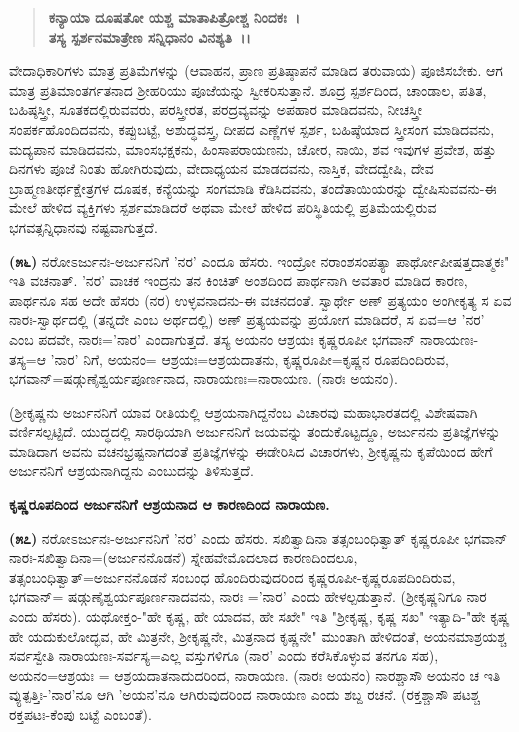 \begin{verse}
\textbf{ಕನ್ಯಾಯಾ ದೂಷತೋ ಯಶ್ಚ ಮಾತಾಪಿತ್ರೋಶ್ಚ ನಿಂದಕಃ~।}\\\textbf{ತಸ್ಯ ಸ್ಪರ್ಶನಮಾತ್ರೇಣ ಸನ್ನಿಧಾನಂ ವಿನಶ್ಯತಿ~।।}
\end{verse}


ವೇದಾಧಿಕಾರಿಗಳು ಮಾತ್ರ ಪ್ರತಿಮೆಗಳನ್ನು (ಆವಾಹನ, ಪ್ರಾಣ ಪ್ರತಿಷ್ಠಾಪನೆ ಮಾಡಿದ ತರುವಾಯ) ಪೂಜಿಸಬೇಕು. ಆಗ ಮಾತ್ರ ಪ್ರತಿಮಾಂತರ್ಗತನಾದ ಶ‍್ರೀಹರಿಯು ಪೂಜೆಯನ್ನು ಸ್ವೀಕರಿಸುತ್ತಾನೆ. ಶೂದ್ರ ಸ್ಪರ್ಶದಿಂದ, ಚಾಂಡಾಲ, ಪತಿತ, ಬಹಿಷ್ಠಸ್ತ್ರೀ, ಸೂತಕದಲ್ಲಿರುವವರು, ಪರಸ್ತ್ರೀರತ, ಪರದ್ರವ್ಯವನ್ನು ಅಪಹಾರ ಮಾಡಿದವನು, ನೀಚಸ್ತ್ರೀ ಸಂಪರ್ಕಹೊಂದಿದವನು, ಕಪ್ಪುಬಟ್ಟೆ, ಅಶುದ್ಧವಸ್ತ್ರ, ದೀಪದ ಎಣ್ಣೆಗಳ ಸ್ಪರ್ಶ, ಬಹಿಷ್ಠೆಯಾದ ಸ್ತ್ರೀಸಂಗ ಮಾಡಿದವನು, ಮದ್ಯಪಾನ ಮಾಡಿದವನು, ಮಾಂಸಭಕ್ಷಕನು, ಹಿಂಸಾಪರಾಯಣನು, ಚೋರ, ನಾಯಿ, ಶವ ಇವುಗಳ ಪ್ರವೇಶ, ಹತ್ತು ದಿನಗಳು ಪೂಜೆ ನಿಂತು ಹೋಗಿರುವುದು, ವೇದಾಧ್ಯಯನ ಮಾಡದವನು, ನಾಸ್ತಿಕ, ವೇದದ್ವೇಷಿ, ದೇವ ಬ್ರಾಹ್ಮಣತೀರ್ಥಕ್ಷೇತ್ರಗಳ ದೂಷಕ, ಕನ್ಯೆಯನ್ನು ಸಂಗಮಾಡಿ ಕೆಡಿಸಿದವನು, ತಂದೆತಾಯಿಯರನ್ನು ದ್ವೇಷಿಸು\-ವವನು-ಈ ಮೇಲೆ ಹೇಳಿದ ವ್ಯಕ್ತಿಗಳು ಸ್ಪರ್ಶಮಾಡಿದರೆ ಅಥವಾ ಮೇಲೆ ಹೇಳಿದ ಪರಿಸ್ಥಿತಿಯಲ್ಲಿ ಪ್ರತಿಮೆಯಲ್ಲಿರುವ ಭಗವತ್ಸನ್ನಿಧಾನವು ನಷ್ಟವಾಗುತ್ತದೆ.

\textbf{(೫೬)} ನರೋಽರ್ಜುನಃ-ಅರ್ಜುನನಿಗೆ 'ನರ' ಎಂದೂ ಹೆಸರು. ಇಂದ್ರೋ ನರಾಂಶ\-ಸಂಪತ್ಯಾ ಪಾರ್ಥೋಪೀಷತ್ತದಾತ್ಮಕಃ" ಇತಿ ವಚನಾತ್. 'ನರ' ವಾಚಕ ಇಂದ್ರನು ತನ ಕಿಂಚಿತ್ ಅಂಶದಿಂದ ಪಾರ್ಥನಾಗಿ ಅವತಾರ ಮಾಡಿದ ಕಾರಣ, ಪಾರ್ಥನೂ ಸಹ ಅದೇ ಹೆಸರು (ನರ) ಉಳ್ಳವನಾದನು-ಈ ವಚನದಂತೆ. ಸ್ವಾರ್ಥೇ ಅಣ್ ಪ್ರತ್ಯಯಂ ಅಂಗೀಕೃತ್ಯ ಸ ಏವ ನಾರಃ-ಸ್ವಾರ್ಥದಲ್ಲಿ (ತನ್ನದೇ ಎಂಬ ಅರ್ಥದಲ್ಲಿ) ಅಣ್ ಪ್ರತ್ಯಯವನ್ನು ಪ್ರಯೋಗ ಮಾಡಿದರೆ, ಸ ಏವ=ಆ 'ನರ' ಎಂಬ ಪದವೇ, ನಾರಃ='ನಾರ' ಎಂದಾಗುತ್ತದೆ. ತಸ್ಯ ಅಯನಂ ಆಶ್ರಯಃ ಕೃಷ್ಣರೂಪೀ ಭಗವಾನ್ ನಾರಾಯಣಃ-ತಸ್ಯ=ಆ 'ನಾರ' ನಿಗೆ, ಅಯನಂ= ಆಶ್ರಯಃ=ಆಶ್ರಯದಾತನು, ಕೃಷ್ಣರೂಪೀ=ಕೃಷ್ಣನ ರೂಪದಿಂದಿರುವ, ಭಗವಾನ್=ಷಡ್ಗುಣೈ\-ಶ್ವರ್ಯಪೂರ್ಣನಾದ, ನಾರಾಯಣಃ=ನಾರಾಯಣ. (ನಾರಃ ಅಯನಂ).

(ಶ‍್ರೀಕೃಷ್ಣನು ಅರ್ಜುನನಿಗೆ ಯಾವ ರೀತಿಯಲ್ಲಿ ಆಶ್ರಯನಾಗಿದ್ದನೆಂಬ ವಿಚಾರವು ಮಹಾಭಾರತದಲ್ಲಿ ವಿಶೇಷವಾಗಿ ವರ್ಣಿಸಲ್ಪಟ್ಟಿದೆ. ಯುದ್ಧದಲ್ಲಿ ಸಾರಥಿಯಾಗಿ ಅರ್ಜುನನಿಗೆ ಜಯವನ್ನು ತಂದುಕೊಟ್ಟದ್ದೂ, ಅರ್ಜುನನು ಪ್ರತಿಜ್ಞೆಗಳನ್ನು ಮಾಡಿದಾಗ ಅವನು ವಚನಭ್ರಷ್ಟನಾಗದಂತೆ ಪ್ರತಿಜ್ಞೆಗಳನ್ನು ಈಡೇರಿಸಿದ ವಿಚಾರಗಳು, ಶ‍್ರೀಕೃಷ್ಣನು ಕೃಪೆಯಿಂದ ಹೇಗೆ ಅರ್ಜುನನಿಗೆ ಆಶ್ರಯನಾಗಿದ್ದನು ಎಂಬುದನ್ನು ತಿಳಿಸುತ್ತದೆ.

\begin{center}
\textbf{ಕೃಷ್ಣರೂಪದಿಂದ ಅರ್ಜುನನಿಗೆ ಆಶ್ರಯನಾದ ಆ ಕಾರಣದಿಂದ ನಾರಾಯಣ.}
\end{center}

\textbf{(೫೭)} ನರೋಽರ್ಜುನಃ-ಅರ್ಜುನನಿಗೆ 'ನರ' ಎಂದು ಹೆಸರು. ಸಖಿತ್ವಾದಿನಾ ತತ್ಸಂಬಂಧಿ\-ತ್ವಾತ್ ಕೃಷ್ಣರೂಪೀ ಭಗವಾನ್ ನಾರಃ-ಸಖಿತ್ವಾದಿನಾ=(ಅರ್ಜುನನೊಡನೆ) ಸ್ನೇಹವೇ\break ಮೊದಲಾದ ಕಾರಣದಿಂದಲೂ, ತತ್ಸಂಬಂಧಿತ್ವಾತ್=ಅರ್ಜುನನೊಡನೆ ಸಂಬಂಧ ಹೊಂದಿರುವುದರಿಂದ ಕೃಷ್ಣರೂಪೀ-ಕೃಷ್ಣರೂಪದಿಂದಿರುವ, ಭಗವಾನ್= ಷಡ್ಗುಣೈಶ್ವರ್ಯಪೂರ್ಣನಾದವನು, ನಾರಃ ='ನಾರ' ಎಂದು ಹೇಳಲ್ಪಡುತ್ತಾನೆ. (ಶ‍್ರೀಕೃಷ್ಣನಿಗೂ ನಾರ ಎಂದು ಹೆಸರು). ಯಥೋಕ್ತಂ-"ಹೇ ಕೃಷ್ಣ, ಹೇ ಯಾದವ, ಹೇ ಸಖೇ" ಇತಿ "ಶ‍್ರೀಕೃಷ್ಣ, ಕೃಷ್ಣ ಸಖ" ಇತ್ಯಾದಿ-"ಹೇ ಕೃಷ್ಣ ಹೇ ಯದುಕುಲೋದ್ಭವ, ಹೇ ಮಿತ್ರನೇ, ಶ‍್ರೀಕೃಷ್ಣನೇ, ಮಿತ್ರನಾದ ಕೃಷ್ಣನೇ" ಮುಂತಾಗಿ ಹೇಳಿದಂತೆ, ಅಯನಮಾಶ್ರಯಶ್ಚ ಸರ್ವಸ್ವೇತಿ ನಾರಾಯಣಃ-\-ಸರ್ವಸ್ಯ=ಎಲ್ಲ ವಸ್ತುಗಳಿಗೂ (ನಾರ' ಎಂದು ಕರೆಸಿಕೊಳ್ಳುವ ತನಗೂ ಸಹ), ಅಯನಂ=\break ಆಶ್ರಯಃ = ಆಶ್ರಯದಾತನಾದುದರಿಂದ, ನಾರಾಯಣ. (ನಾರಃ ಅಯನಂ) ನಾರಶ್ಚಾಸೌ ಅಯನಂ ಚ ಇತಿ ವ್ಯುತ್ಪತ್ತಿಃ-'ನಾರ'ನೂ ಆಗಿ 'ಅಯನ'ನೂ ಆಗಿರುವುದರಿಂದ ನಾರಾಯಣ ಎಂದು ಶಬ್ದ ರಚನೆ. (ರಕ್ತಶ್ಚಾಸೌ ಪಟಶ್ಚ ರಕ್ತಪಟಃ-ಕೆಂಪು ಬಟ್ಟೆ ಎಂಬಂತೆ).


